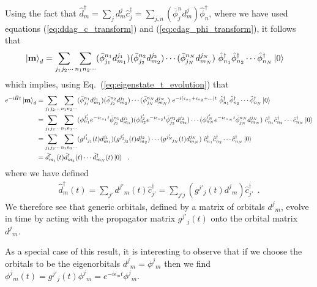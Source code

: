 \documentclass[aps, superscriptaddress, floatfix, onecolumn]{revtex4-2}
\begin{document}
Using the fact that $\hat{d}^\dagger_m = \sum_j d^j_m \hat{c}^\dagger_j = \sum_{j, n} (\bar{\phi}^n_j d^j_m ) \hat{\phi}^\dagger_n$, where we have used equations (\ref{eq:ddag_c_transform}) and (\ref{eq:cdag_phi_transform}), it follows that 
\begin{align}
\ket{\mathbf{m}}_d & = \sum_{j_1 j_2 \cdots}   \sum_{n_1 n_2 \cdots}  ( \bar{\phi}^{n_1}_{j_1} d^{j_1}_{m_1} ) (\bar{\phi}^{n_2}_{j_2} d^{j_2}_{m_2} ) \cdots (\bar{\phi}^{n_N}_{j_N} d^{j_N}_{m_N} ) \ \hat{\phi}^\dagger_{n_1} \hat{\phi}^\dagger_{n_2}  \cdots \hat{\phi}^\dagger_{n_N} \ket{0} 
\end{align}
which implies, using Eq.~(\ref{eq:eigenstate_t_evolution}) that
\begin{align}
e^{-i \hat{H} t} \ket{\mathbf{m}}_d & = \sum_{j_1 j_2 \cdots}   \sum_{n_1 n_2 \cdots}  ( \bar{\phi}^{n_1}_{j_1} d^{j_1}_{m_1} ) (\bar{\phi}^{n_2}_{j_2} d^{j_2}_{m_2} ) \cdots (\bar{\phi}^{n_N}_{j_N} d^{j_N}_{m_N} ) \ e^{-i (\epsilon_{n_1} + \epsilon_{n_2} + \ldots) t}\  \hat{\phi}^\dagger_{n_1} \hat{\phi}^\dagger_{n_2}  \cdots \hat{\phi}^\dagger_{n_N} \ket{0}  \\ 
& = \sum_{j_1 j_2 \cdots}   \sum_{n_1 n_2 \cdots}  (\phi^{j'_1}_{n_1} e^{-i \epsilon_{n_1} t}   \bar{\phi}^{n_1}_{j_1} d^{j_1}_{m_1}) (\phi^{j'_2}_{n_2} e^{-i \epsilon_{n_2} t}  \bar{\phi}^{n_2}_{j_2}  d^{j_2}_{m_2}) \cdots (\phi^{j'_N}_{n_N} e^{-i \epsilon_{n_N} t}  \bar{\phi}^{n_N}_{j_N}  d^{j_N}_{m_N})  \ \hat{c}^\dagger_{n_1} \hat{c}^\dagger_{n_2}  \cdots \hat{c}^\dagger_{n_N} \ket{0}   \\
& = \sum_{j_1 j_2 \cdots}   \sum_{n_1 n_2 \cdots}  (g^{j'_1}\!_{j_1}(t) d^{j_1}_{m_1}) (g^{j'_2}\!_{j_2}(t) d^{j_2}_{m_2}) \cdots (g^{j'_N}\!_{j_N}(t) d^{j_N}_{m_N})  \ \hat{c}^\dagger_{n_1} \hat{c}^\dagger_{n_2}  \cdots \hat{c}^\dagger_{n_N} \ket{0}   \\
& = \hat{d}^\dagger_{m_1}(t) \hat{d}^\dagger_{m_2}(t) \cdots \hat{d}^\dagger_{m_N}(t)  \ket{0} \ \ .
\end{align}
where we have defined
\begin{align}
\boxed{\hat{d}^\dagger_m(t) = \sum_{j'} d^{j'}\!_m(t) \hat{c}^\dagger_{j'} = \sum_{j' j} \left(g^{j'}\!_{j}(t) d^j\!_m \right) \hat{c}^\dagger_{j'}} \ \ . 
\end{align}
We therefore see that generic orbitals, defined by a matrix of orbitals $d^j\!_m$, evolve in time by acting with the propagator matrix $g^{j'}\!_j(t)$ onto
the orbital matrix $d^j\!_m$.

As a special case of this result, it is interesting to observe that if we choose the orbitals to be the eigenorbitals $d^j\!_m = \phi^j\!_m$ then we find 
$\phi^j\!_m(t) = g^{j'}\!_j(t) \phi^j\!_m = e^{-i \epsilon_m t} \phi^j\!_m$.
\end{document}
